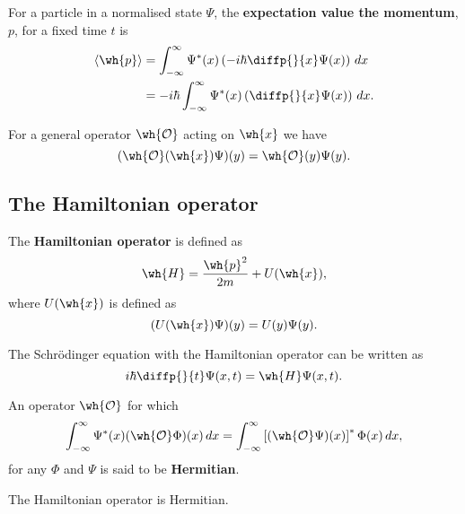\documentclass[12pt, a4paper]{article}
\begin{document}
\begin{definition}
    For a particle in a normalised state \(\Psi\), the \textbf{expectation value the momentum}, \(p\), for a fixed time \(t\) is 
    \[\begin{aligned}
        \langle \wh{p} \rangle &= \int_{-\infty}^{\infty} \Psi^*(x)\left( - i \hbar \diffp{}{x}\Psi(x) \right) \, dx \\
       &= -i \hbar \int_{-\infty}^{\infty} \Psi^*(x) \left( \diffp{}{x}\Psi(x) \right) \, dx.
    \end{aligned}\]
\end{definition}

\begin{mdthm}
    For a general operator \(\wh{\mathcal{O}}\) acting on \(\wh{x}\) we have
    \[(\wh{\mathcal{O}}(\wh{x}) \Psi)(y) = \wh{\mathcal{O}}(y)\Psi(y).\]
\end{mdthm}

\subsection{The Hamiltonian operator}

\begin{definition}
    The \textbf{Hamiltonian operator} is defined as 
    \[\wh{H} = \frac{\wh{p}^2}{2m} + U(\wh{x}),\]
    where \(U(\wh{x})\) is defined as 
    \[(U(\wh{x})\Psi) (y) = U(y)\Psi(y).\]
\end{definition}

\begin{mdthm}
    The Schrödinger equation with the Hamiltonian operator can be written as 
    \[i \hbar \diffp{}{t}\Psi(x,t) = \wh{H} \Psi(x,t).\]
\end{mdthm}

\begin{definition}
    An operator \(\wh{\mathcal{O}}\) for which 
    \[\int_{-\infty}^{\infty} \Psi^*(x)(\wh{\mathcal{O}} \Phi)(x) \, dx= \int_{-\infty}^{\infty} \left[ (\wh{\mathcal{O}} \Psi) (x) \right]^* \Phi(x) \, dx,\]
    for any \(\Phi\) and \(\Psi\) is said to be \textbf{Hermitian}.
\end{definition}

\begin{mdthm}
    The Hamiltonian operator is Hermitian.
\end{mdthm}
\end{document}
